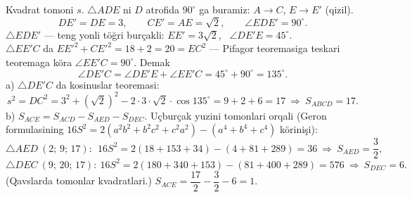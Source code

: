 \newpage
{}
Kvadrat tomoni $s$. $\triangle ADE$ ni $D$ atrofida $90^\circ$ ga buramiz: $A\to C$, $E\to E'$ (\textcolor{aux}{qizil}).
\[DE'=DE=3,\qquad CE'=AE=\sqrt2,\qquad \angle EDE'=90^\circ.\]
$\triangle EDE'$ — teng yonli töğri burçakli: $EE'=3\sqrt2$, \ $\angle DE'E=45^\circ$.\\
$\triangle EE'C$ da $EE'^2+CE'^2=18+2=20=EC^2$ — Pifagor teoremasiga teskari teoremaga köra $\angle EE'C=90^\circ$. Demak
\[\angle DE'C=\angle DE'E+\angle EE'C=45^\circ+90^\circ=135^\circ.\]
a) $\triangle DE'C$ da kosinuslar teoremasi:
\[s^2=DC^2=3^2+(\sqrt2)^2-2\cdot3\cdot\sqrt2\cdot\cos135^\circ=9+2+6=17\ \Rightarrow\ S_{ABCD}=17.\]
b) $S_{ACE}=S_{ACD}-S_{AED}-S_{DEC}$. Uçburçak yuzini tomonlari orqali (Geron formulasining $16S^2=2(a^2b^2+b^2c^2+c^2a^2)-(a^4+b^4+c^4)$ körinişi):
\[\triangle AED\ (2;\,9;\,17):\ \ 16S^2=2(18+153+34)-(4+81+289)=36\ \Rightarrow\ S_{AED}=\frac32,\]
\[\triangle DEC\ (9;\,20;\,17):\ 16S^2=2(180+340+153)-(81+400+289)=576\ \Rightarrow\ S_{DEC}=6.\]
(Qavslarda tomonlar kvadratlari.) \quad $S_{ACE}=\dfrac{17}2-\dfrac32-6=1.$

